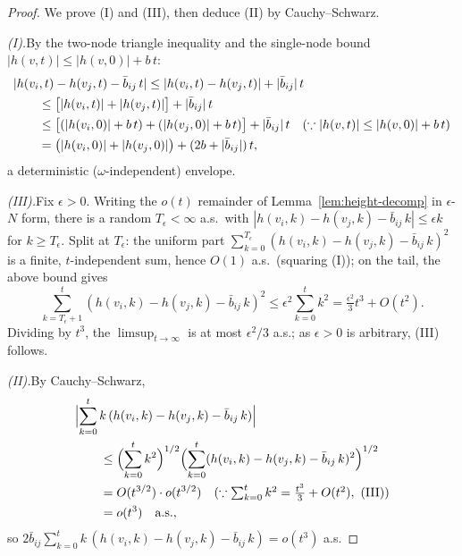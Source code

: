 \documentclass[11pt]{article}
\theoremstyle{definition}
\begin{document}
\begin{proof}
We prove (I) and (III), then deduce (II) by Cauchy--Schwarz.

\smallskip\noindent\textit{(I).}\quad By the two-node triangle inequality and the single-node bound $|h(v, t)| \leq |h(v, 0)| + b\,t$:
\begin{align*}
\MoveEqLeft[2] |h(v_i,t) - h(v_j,t) - \bar{b}_{ij}\,t|
\leq |h(v_i,t) - h(v_j,t)| + |\bar{b}_{ij}|\,t \\
&\leq \bigl[|h(v_i, t)| + |h(v_j, t)|\bigr] + |\bar{b}_{ij}|\,t \\
&\leq \bigl[(|h(v_i, 0)| + b\,t) + (|h(v_j, 0)| + b\,t)\bigr] + |\bar{b}_{ij}|\,t
   \quad (\because |h(v, t)| \leq |h(v, 0)| + b\,t) \\
&= \bigl(|h(v_i, 0)| + |h(v_j, 0)|\bigr) + (2b + |\bar{b}_{ij}|)\,t,
\end{align*}
a deterministic ($\omega$-independent) envelope.

\smallskip\noindent\textit{(III).}\quad Fix $\epsilon > 0$. Writing the $o(t)$ remainder of Lemma~\ref{lem:height-decomp} in $\epsilon$-$N$ form, there is a random $T_\epsilon < \infty$ a.s.\ with $|h(v_i,k) - h(v_j,k) - \bar{b}_{ij}\,k| \leq \epsilon k$ for $k \geq T_\epsilon$. Split at $T_\epsilon$: the uniform part $\sum_{k=0}^{T_\epsilon}(h(v_i,k) - h(v_j,k) - \bar{b}_{ij}\,k)^2$ is a finite, $t$-independent sum, hence $O(1)$ a.s.\ (squaring (I)); on the tail, the above bound gives
\[
\sum_{k=T_\epsilon+1}^{t} (h(v_i,k) - h(v_j,k) - \bar{b}_{ij}\,k)^2 \leq \epsilon^2 \sum_{k=0}^{t} k^2 = \tfrac{\epsilon^2}{3}t^3 + O(t^2).
\]
Dividing by $t^3$, the $\limsup_{t\to\infty}$ is at most $\epsilon^2/3$ a.s.; as $\epsilon > 0$ is arbitrary, (III) follows.

\smallskip\noindent\textit{(II).}\quad By Cauchy--Schwarz,
\begin{align*}
\MoveEqLeft[2] \Bigl|\sum_{k=0}^{t} k\,(h(v_i,k) - h(v_j,k) - \bar{b}_{ij}\,k)\Bigr| \\
&\leq \Bigl(\sum_{k=0}^{t} k^2\Bigr)^{1/2} \Bigl(\sum_{k=0}^{t} (h(v_i,k) - h(v_j,k) - \bar{b}_{ij}\,k)^2\Bigr)^{1/2} \\
&= O(t^{3/2}) \cdot o(t^{3/2})
   \quad (\because \textstyle\sum_{k=0}^t k^2 = \tfrac{t^3}{3}+O(t^2),\ \text{(III)}) \\
&= o(t^3) \quad \text{a.s.},
\end{align*}
so $2\bar{b}_{ij}\sum_{k=0}^{t} k\,(h(v_i,k) - h(v_j,k) - \bar{b}_{ij}\,k) = o(t^3)$ a.s.
\end{proof}
\end{document}
